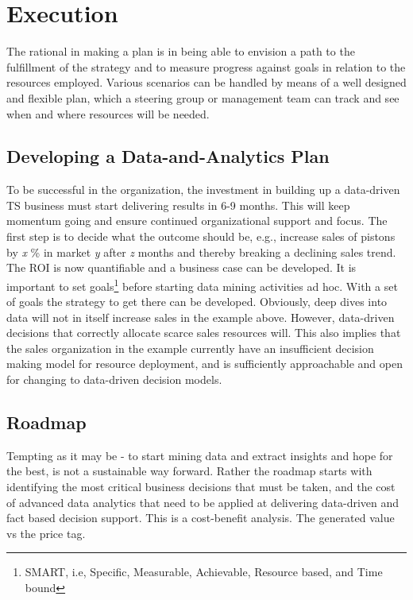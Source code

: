 \documentclass[10pt]{article} %
\begin{document}
\section{Execution}

The rational in making a plan is in being able to envision a path to the fulfillment of the strategy and to measure progress against goals in relation to the resources employed. Various scenarios can be handled by means of a well designed and flexible plan, which a steering group or management team can track and see when and where resources will be needed.


\subsection{Developing a Data-and-Analytics Plan}

To be successful in the organization, the investment in building up a data-driven TS business must start delivering results in 6-9 months. This will keep momentum going and ensure continued organizational support and focus. The first step is to decide what the outcome should be, e.g., increase sales of pistons by \textit{x} \% in market \textit{y} after \textit{z} months and thereby breaking a declining sales trend. The ROI is now quantifiable and a business case can be developed. It is important to set goals\footnote{SMART, i.e, Specific, Measurable, Achievable, Resource based, and Time bound} before starting data mining activities ad hoc. With a set of goals the strategy to get there can be developed. Obviously, deep dives into data will not in itself increase sales in the example above. However, data-driven decisions that correctly allocate scarce sales resources will. This also implies that the sales organization in the example currently have an insufficient decision making model for resource deployment, and is sufficiently approachable and open for changing to data-driven decision models.


\subsection{Roadmap}

Tempting as it may be - to start mining data and extract insights and hope for the best, is not a sustainable way forward. Rather the roadmap starts with identifying the most critical business decisions that must be taken, and the cost of advanced data analytics that need to be applied at delivering data-driven and fact based decision support. This is a cost-benefit analysis. The generated value vs the price tag.
\end{document}
